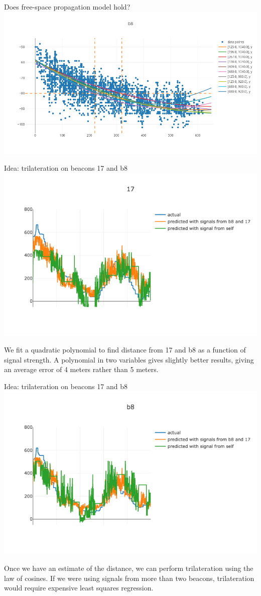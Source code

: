 \documentclass[landscape]{infslides}
\begin{document}
\begin{slide}{Does free-space propagation model hold?}
    \thispagestyle{nofooter}
\includegraphics[height=0.84\textheight,width=\textwidth]{images/different_directions.png}
\end{slide}

\begin{slide}{Idea: trilateration on beacons 17 and b8}
    \centering
\includegraphics[width=0.55\linewidth]{images/dist_f_rssi_17.png}

We fit a quadratic polynomial to find distance from 17 and b8 as a function of signal strength. A polynomial in two variables gives slightly better results, giving an average error of 4 meters rather than 5 meters.
\end{slide}

\begin{slide}{Idea: trilateration on beacons 17 and b8}
    \centering
\includegraphics[width=0.55\linewidth]{images/dist_f_rssi_b8.png}

Once we have an estimate of the distance, we can perform trilateration using the law of cosines. If we were using signals from more than two beacons, trilateration would require expensive least squares regression.
\end{slide}
\end{document}
